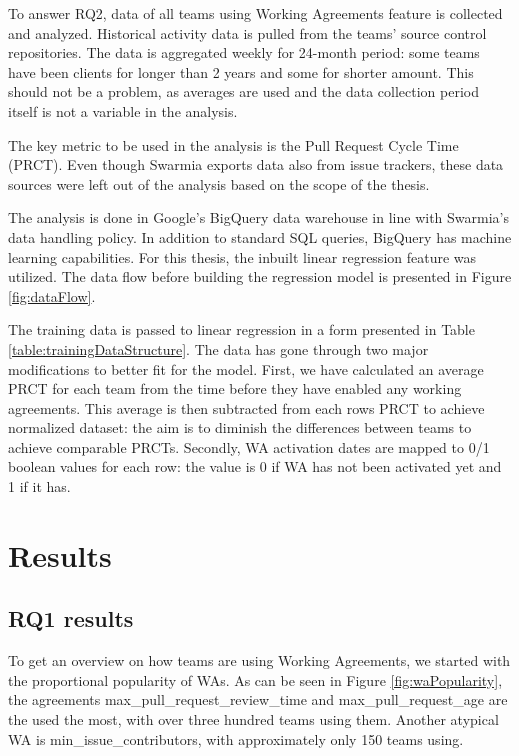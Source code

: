 To answer RQ2, data of all teams using Working Agreements feature is collected and analyzed. Historical activity data is pulled from the teams' source control repositories. The data is aggregated weekly for 24-month period: some teams have been clients for longer than 2 years and some for shorter amount. This should not be a problem, as averages are used and the data collection period itself is not a variable in the analysis.

The key metric to be used in the analysis is the Pull Request Cycle Time (PRCT). Even though Swarmia exports data also from issue trackers, these data sources were left out of the analysis based on the scope of the thesis.

The analysis is done in Google's BigQuery data warehouse in line with Swarmia's data handling policy. In addition to standard SQL queries, BigQuery has machine learning capabilities. For this thesis, the inbuilt linear regression feature was utilized. The data flow before building the regression model is presented in Figure \ref{fig:dataFlow}. 

The training data is passed to linear regression in a form presented in Table \ref{table:trainingDataStructure}. The data has gone through two major modifications to better fit for the model. First, we have calculated an average PRCT for each team from the time before they have enabled any working agreements. This average is then subtracted from each rows PRCT to achieve normalized dataset: the aim is to diminish the differences between teams to achieve comparable PRCTs. Secondly, WA activation dates are mapped to 0/1 boolean values for each row: the value is 0 if WA has not been activated yet and 1 if it has.





\section{Results}

\subsection{RQ1 results}

To get an overview on how teams are using Working Agreements, we started with the proportional popularity of WAs. As can be seen in Figure \ref{fig:waPopularity}, the agreements max\_pull\_request\_review\_time and max\_pull\_request\_age are the used the most, with over three hundred teams using them. Another atypical WA is min\_issue\_contributors, with approximately only 150 teams using.

